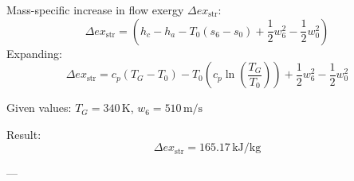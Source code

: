 Mass-specific increase in flow exergy \( \Delta ex_{\text{str}} \):  
\[ 
\Delta ex_{\text{str}} = (h_c - h_a - T_0 (s_6 - s_0) + \frac{1}{2} w_6^2 - \frac{1}{2} w_0^2) 
\]  
Expanding:  
\[ 
\Delta ex_{\text{str}} = c_p (T_G - T_0) - T_0 \left( c_p \ln \left( \frac{T_G}{T_0} \right) \right) + \frac{1}{2} w_6^2 - \frac{1}{2} w_0^2 
\]  

Given values:  
\( T_G = 340 \, \text{K} \), \( w_6 = 510 \, \text{m/s} \)  

Result:  
\[ 
\Delta ex_{\text{str}} = 165.17 \, \text{kJ/kg} 
\]  

---
